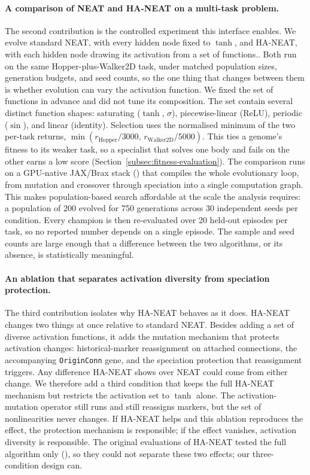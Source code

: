 \documentclass[12pt]{article}
\begin{document}
\paragraph{A comparison of NEAT and HA-NEAT on a multi-task problem.}
The second contribution is the controlled experiment this interface enables.
We evolve standard NEAT, with every hidden node fixed to $\tanh$, and HA-NEAT, with each hidden node drawing its activation from a set of functions..
Both run on the same Hopper-plus-Walker2D task, under matched population sizes, generation budgets, and seed counts, so the one thing that changes between them is whether evolution can vary the activation function.
We fixed the set of functions in advance and did not tune its composition.
The set contain several distinct function shapes: saturating ($\tanh$, $\sigma$), piecewise-linear (ReLU), periodic ($\sin$), and linear (identity).
Selection uses the normalised minimum of the two per-task returns, $\min(r_{\text{Hopper}}/3000,\, r_{\text{Walker2D}}/5000)$.
This ties a genome's fitness to its weaker task, so a specialist that solves one body and fails on the other earns a low score (Section~\ref{subsec:fitness-evaluation}).
The comparison runs on a GPU-native JAX/Brax stack (\cite{freeman_brax_2021,wang_tensorized_2024}) that compiles the whole evolutionary loop, from mutation and crossover through speciation into a single computation graph.
This makes population-based search affordable at the scale the analysis requires: a population of 200 evolved for 750 generations across 30 independent seeds per condition.
Every champion is then re-evaluated over 20 held-out episodes per task, so no reported number depends on a single episode.
The sample and seed counts are large enough that a difference between the two algorithms, or its absence, is statistically meaningful.

\paragraph{An ablation that separates activation diversity from speciation protection.}
The third contribution isolates why HA-NEAT behaves as it does.
HA-NEAT changes two things at once relative to standard NEAT.
Besides adding a set of diverse activation functions, it adds the mutation mechanism that protects activation changes: historical-marker reassignment on attached connections, the accompanying \texttt{OriginConn} gene, and the speciation protection that reassignment triggers.
Any difference HA-NEAT shows over NEAT could come from either change.
We therefore add a third condition that keeps the full HA-NEAT mechanism but restricts the activation set to $\tanh$ alone.
The activation-mutation operator still runs and still reassigns markers, but the set of nonlinearities never changes.
If HA-NEAT helps and this ablation reproduces the effect, the protection mechanism is responsible; if the effect vanishes, activation diversity is responsible.
The original evaluations of HA-NEAT tested the full algorithm only (\cite{hagg_evolving_2017}), so they could not separate these two effects; our three-condition design can.
\end{document}
